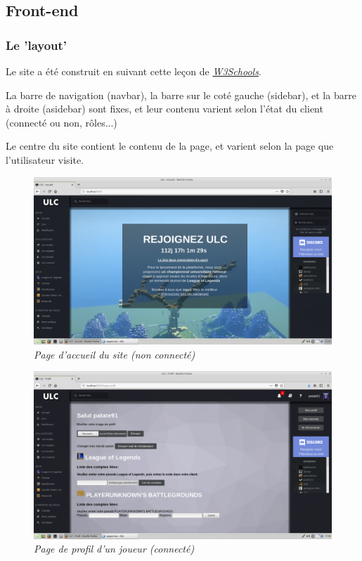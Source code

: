 \documentclass[10pt]{article}
\begin{document}
    \newpage
    \subsection{Front-end}
      \subsubsection{Le 'layout'}
	Le site a été construit en suivant cette leçon de \href{https://www.w3schools.com/css/css_website_layout.asp}{\textit{W3Schools}}.
	
	La barre de navigation (navbar), la barre sur le coté gauche (sidebar), et la barre à droite (asidebar) sont fixes,
	et leur contenu varient selon l'état du client (connecté ou non, rôles...)
	
	Le centre du site contient le contenu de la page, et varient selon la page que l'utilisateur visite.
	
	\begin{figure}[H]
	  \begin{center}
	    \includegraphics[width=12cm,keepaspectratio]{./images/site.png}
	  \end{center}
	  \caption{\textit{Page d'accueil du site (non connecté)}}
	  \label{site}
	\end{figure}
	
	\begin{figure}[H]
	  \begin{center}
	    \includegraphics[width=12cm,keepaspectratio]{./images/profil.png}
	  \end{center}
	  \caption{\textit{Page de profil d'un joueur (connecté)}}
	  \label{profil}
	\end{figure}
      
\end{document}

